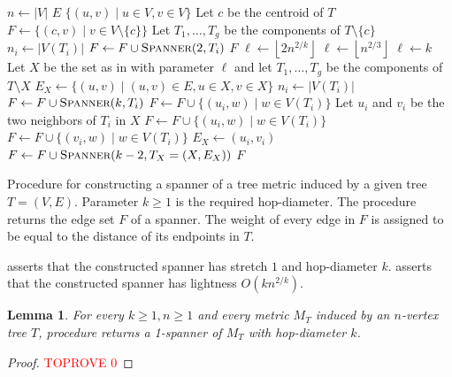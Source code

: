 \documentclass[11pt,english]{article}
\newcommand{\floor}[1]{\ensuremath{\left\lfloor#1\right\rfloor}}
\newtheorem{lemma}[theorem]{Lemma}
\begin{document}
\begin{algorithm}[!ht]
\begin{algorithmic}[1]
\State $n \gets |V|$
\State\Return $E$
\EndIf
{}
\State\Return $\{(u, v) \mid u \in V, v \in V\}$  
\EndIf
{}
\State Let $c$ be the centroid of $T$
\State $F \gets \{(c, v) \mid v \in V \setminus \{c\} \}$ 
\State Let $T_1,  \ldots, T_g$ be the components of $T \setminus \{c\}$
\State $n_i \gets |V(T_i)|$
\State $F\gets F \cup \Call{Spanner}{2, T_i}$
\EndFor 
\State\Return $F$
\EndIf
\State $\ell \gets \floor{2n^{2/k}}$
 $\ell \gets \floor{n^{2/3}}$
\EndIf
{} $\ell \gets k$
\EndIf
\State Let $X$ be the set as in  with parameter $\ell$ and let $T_1, \ldots, T_g$ be the components of $T \setminus X$
\State $E_X \gets \{ (u,v) \mid (u,v) \in E, u \in X, v \in X\}$ \label{lin:ex-1}
\State $n_i \gets |V(T_i)|$
\State $F \gets F \cup \Call{Spanner}{k, T_i}$
  $F \gets F \cup \{(u_i, w) \mid w \in V(T_i)\}$
\Else
\State Let $u_i$ and $v_i$ be the two neighbors of $T_i$ in $X$
\State $F \gets F \cup \{(u_i, w) \mid w \in V(T_i)\}$
\State $F \gets F \cup \{(v_i, w) \mid w \in V(T_i)\}$
\State $E_X \gets (u_i, v_i)$ \label{lin:ex-2}
\EndIf
\EndFor
\State $F \gets F \cup  \Call{Spanner}{k-2, T_X = (X, E_X)}$
\State\Return $F$
\EndProcedure
\end{algorithmic}
\caption{Procedure for constructing a spanner of a tree metric induced by a given tree $T= (V,E)$. Parameter $k\ge 1$ is the required hop-diameter. The procedure returns the edge set $F$ of a spanner. The weight of every edge in $F$ is assigned to be equal to the distance of its endpoints in $T$.}\label{alg:ub}
\end{algorithm}




 asserts that the constructed spanner has stretch $1$ and hop-diameter $k$.  asserts that the constructed spanner has lightness $O(kn^{2/k})$.

\begin{lemma}\label{lem:stretch-n-hop}
For every $k \ge 1, n \ge 1$ and every metric $M_T$ induced by an $n$-vertex tree $T$, procedure  returns a 1-spanner of $M_T$ with hop-diameter $k$. 
\end{lemma}
\begin{proof}\textcolor{red}{TOPROVE 0}\end{proof}
\end{document}
